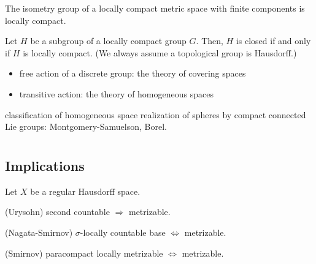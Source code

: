 \documentclass{../../large}
\begin{document}
The isometry group of a locally compact metric space with finite components is locally compact.


\begin{prb}
Let $H$ be a subgroup of a locally compact group $G$.
Then, $H$ is closed if and only if $H$ is locally compact.
(We always assume a topological group is Hausdorff.)
\end{prb}

\begin{itemize}
\item free action of a discrete group: the theory of covering spaces
\item transitive action: the theory of homogeneous spaces
\end{itemize}

classification of homogeneous space realization of spheres by compact connected Lie groups: Montgomery-Samuelson, Borel.





\begin{prb}
\end{prb}




\chapter{}
























\newpage
\section*{Implications}

\begin{prb}
Let $X$ be a regular Hausdorff space.
\begin{parts}
\item (Urysohn) second countable $\Rightarrow$ metrizable.
\item (Nagata-Smirnov) $\sigma$-locally countable base $\Leftrightarrow$ metrizable.
\item (Smirnov) paracompact locally metrizable $\Leftrightarrow$ metrizable.
\end{parts}
\end{prb}
\end{document}
